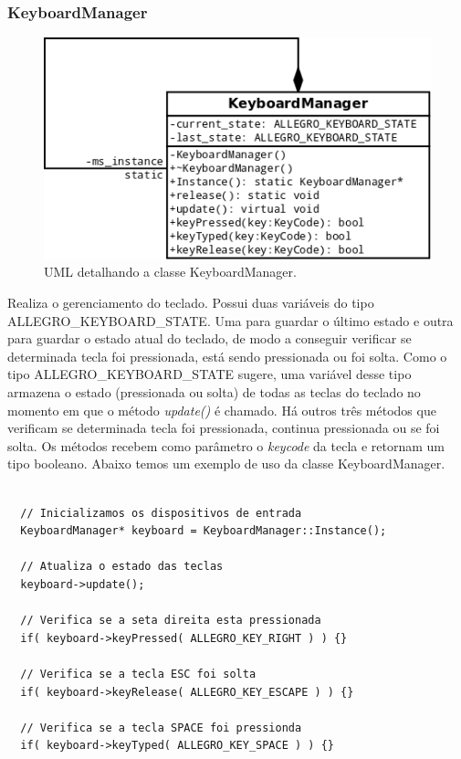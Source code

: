 \subsubsection{KeyboardManager}
%
%
%
\begin{figure}[h]
    \centering
		\caption{UML detalhando a classe KeyboardManager.}
    \label{KeyboardManager}
    \includegraphics[scale = 0.6]{uml/KeyboardManager.png}
\end{figure}
%
%
Realiza o gerenciamento do teclado. Possui duas variáveis do tipo ALLEGRO\_KEYBOARD\_STATE. Uma para guardar o último estado e outra para guardar o estado atual do teclado, de modo a conseguir verificar se determinada tecla foi pressionada, está sendo pressionada ou foi solta. Como o tipo ALLEGRO\_KEYBOARD\_STATE sugere, uma variável desse tipo armazena o estado (pressionada ou solta) de todas as teclas do teclado no momento em que o método \textit{update()} é chamado. Há outros três métodos que verificam se determinada tecla foi pressionada, continua pressionada ou se foi solta. Os métodos recebem como parâmetro o \textit{keycode} da tecla e retornam um tipo booleano. Abaixo temos um exemplo de uso da classe KeyboardManager.
%
%
\begin{lstlisting}

  // Inicializamos os dispositivos de entrada
  KeyboardManager* keyboard = KeyboardManager::Instance();
  
  // Atualiza o estado das teclas
  keyboard->update();
	
  // Verifica se a seta direita esta pressionada
  if( keyboard->keyPressed( ALLEGRO_KEY_RIGHT ) ) {}
  
  // Verifica se a tecla ESC foi solta
  if( keyboard->keyRelease( ALLEGRO_KEY_ESCAPE ) ) {}
  
  // Verifica se a tecla SPACE foi pressionda
  if( keyboard->keyTyped( ALLEGRO_KEY_SPACE ) ) {}
	      
\end{lstlisting}
%
